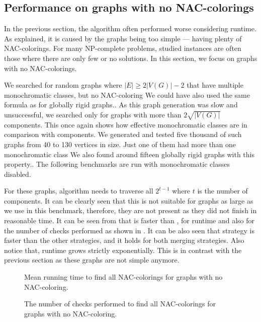 \subsection{Performance on graphs with no NAC-colorings}

In the previous section, the \Subgraphs{} algorithm
often performed worse considering runtime.
As explained, it is caused by the graphs being too simple
--- having plenty of NAC-colorings.
%
For many NP-complete problems, studied instances are often
those where there are only few or no solutions.
In this section, we focus on graphs with no NAC-colorings.

We searched for random graphs where \( |E| \ge 2|V(G)| - 2 \) that have
multiple monochromatic classes, but no NAC-coloring
{We could have also used the same formula as for globally rigid graphs.}.
%
As this graph generation was slow and unsuccessful, we searched only for
graphs with more than \( 2\sqrt{|V(G)|} \) \trcon{} components.
%
This once again shows how effective monochromatic classes are
in comparison with \trcon{} components.
We generated and tested five thousand of such graphs from 40 to 130 vertices in size.
Just one of them had more than one monochromatic class
{We also found around fifteen globally rigid graphs with this property.}.
%
The following benchmarks are run with monochromatic classes disabled.

For these graphs, \NaiveCycles{} algorithm needs to traverse all \( 2^{t-1} \)
where \( t \) is the number of \trcon{} components. It can be clearly seen that
this is not suitable for graphs as large as we use in this benchmark,
therefore, they are not present as they did not finish in reasonable time.
It can be seen from 
that \SharedVertices{} is faster than \MergeLinear{},
for runtime and also for the number of checks performed
as shown in .
%
It can be also seen that \NeighborsDegree{} strategy is
faster than the other strategies, and it holds for both merging strategies.
Also notice that,
runtime grows strictly exponentially.
This is in contrast with the previous section
as these graphs are not simple anymore.

\begin{figure}[thbp]
	\centering
	\scalebox{\BenchFigureScale}{}
	\caption[Mean runtime for graphs with no NAC-coloring]{
		Mean running time to find all NAC-colorings for graphs with no NAC-coloring.}%
	\label{fig:graph_no_nac_coloring_first_runtime}
\end{figure}%
\begin{figure}[thbp]
	\centering
	\scalebox{\BenchFigureScale}{}
	\caption[Checks performed for graphs with no NAC-coloring]{
		The number of checks performed to find all NAC-colorings for graphs with no NAC-coloring.}%
	\label{fig:graph_no_nac_coloring_first_checks}
\end{figure}%

